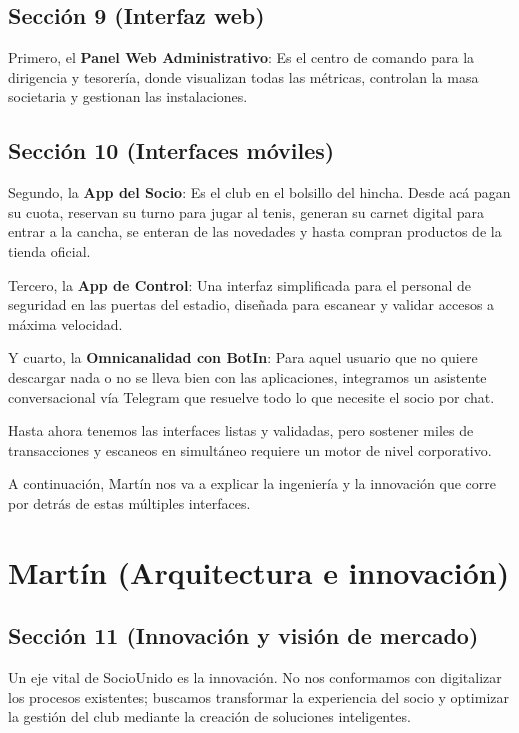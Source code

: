 \subsection{Sección 9 (Interfaz web)}

Primero, el \textbf{Panel Web Administrativo}: Es el centro de comando para la dirigencia y tesorería, donde visualizan todas las métricas, controlan la masa societaria y gestionan las instalaciones.

\subsection{Sección 10 (Interfaces móviles)}

Segundo, la \textbf{App del Socio}: Es el club en el bolsillo del hincha. Desde acá pagan su cuota, reservan su turno para jugar al tenis, generan su carnet digital para entrar a la cancha, se enteran de las novedades y hasta compran productos de la tienda oficial.

Tercero, la \textbf{App de Control}: Una interfaz simplificada para el personal de seguridad en las puertas del estadio, diseñada para escanear y validar accesos a máxima velocidad.

Y cuarto, la \textbf{Omnicanalidad con BotIn}: Para aquel usuario que no quiere descargar nada o no se lleva bien con las aplicaciones, integramos un asistente conversacional vía Telegram que resuelve todo lo que necesite el socio por chat.

Hasta ahora tenemos las interfaces listas y validadas, pero sostener miles de transacciones y escaneos en simultáneo requiere un motor de nivel corporativo.

A continuación, Martín nos va a explicar la ingeniería y la innovación que corre por detrás de estas múltiples interfaces.

\newpage

\section{Martín (Arquitectura e innovación)}

\subsection{Sección 11 (Innovación y visión de mercado)}

Un eje vital de SocioUnido es la innovación. No nos conformamos con digitalizar los procesos existentes; buscamos transformar la experiencia del socio y optimizar la gestión del club mediante la creación de soluciones inteligentes.

